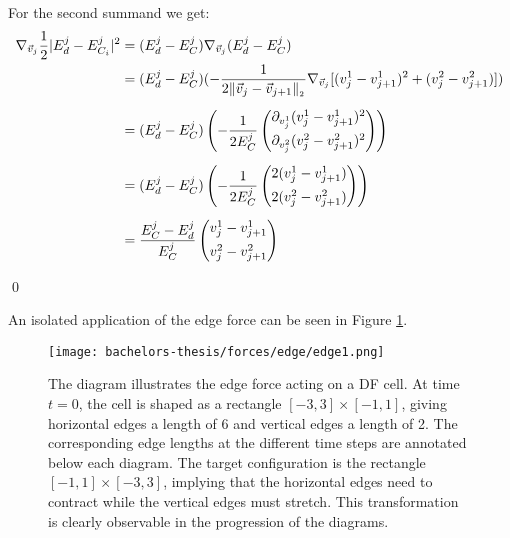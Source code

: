 \begin{proposition}
	For the second summand we get:
	\begin{align*}
		\nabla_{\vec{v}_{j}} \frac{1}{2} | E^{j}_d - E^j_{C_i}|^2 &= (E^j_d - E^j_C) \nabla_{\vec{v}_j} (E^j_d - E^j_C) \\
		&= (E^j_d - E^j_C) (- \frac{1}{2 \norm[\vec{v}_j - \vec{v}_{j+1}]} \nabla_{\vec{v}_j} [(v_j^1 - v_{j+1}^1)^2 + (v_j^2 - v_{j+1}^2)]) \\[0.5em] 
		&= (E^j_d - E^j_C) \left(- \frac{1}{2 E^j_C} \begin{pmatrix}
			\partial_{v_j^1} (v_j^1 - v_{j+1}^1)^2 \\[0.5em]
			\partial_{v_j^2} (v_j^2 - v_{j+1}^2)^2
		\end{pmatrix}\right) \\[0.5em]
		&= (E^j_d - E^j_C) \left(- \frac{1}{2 E^j_C} \begin{pmatrix}
			 2(v_j^1 - v_{j+1}^1) \\[0.5em]
			 2(v_j^2 - v_{j+1}^2)
		\end{pmatrix}\right) \\[0.5em] 
		&= \frac{E^j_C - E^j_d}{E^j_C} \begin{pmatrix}
			v_j^1 - v_{j+1}^1 \\[0.5em]
			v_j^2 - v_{j+1}^2
	   \end{pmatrix} 
	\end{align*}
	
	

	\qed  
\end{proposition}

An isolated application of the edge force can be seen in Figure \ref{fig:edgeForce}.  

\begin{figure}
	\begin{center}
		\texttt{[image: bachelors-thesis/forces/edge/edge1.png]}
		\caption{The diagram illustrates the edge force acting on a DF cell.
		At time $t=0$, the cell is shaped as a rectangle $[-3,3]\times [-1,1]$, giving horizontal edges a length of 6 and vertical edges a length of 2.
		The corresponding edge lengths at the different time steps are annotated below each diagram.
		The target configuration is the rectangle $[-1,1]\times [-3,3]$, implying that the horizontal edges need to contract while the vertical edges must stretch.
		This transformation is clearly observable in the progression of the diagrams.
		}
		\label{fig:edgeForce}
	\end{center}
\end{figure}


